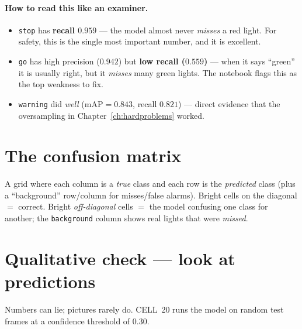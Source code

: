 \paragraph{How to read this like an examiner.}
\begin{itemize}
  \item \texttt{stop} has \textbf{recall $0.959$} --- the model almost
        never \emph{misses} a red light. For safety, this is the single
        most important number, and it is excellent.
  \item \texttt{go} has high precision ($0.942$) but \textbf{low recall
        ($0.559$)} --- when it says ``green'' it is usually right, but it
        \emph{misses} many green lights. The notebook flags this as the
        top weakness to fix.
  \item \texttt{warning} did \emph{well} ($\text{mAP}=0.843$,
        recall $0.821$) --- direct evidence that the oversampling in
        Chapter~\ref{ch:hardproblems} worked.
\end{itemize}


\section{The confusion matrix}
\begin{keyconcept}
A grid where each column is a \emph{true} class and each row is the
\emph{predicted} class (plus a ``background'' row/column for
misses/false alarms). Bright cells on the diagonal $=$ correct. Bright
\emph{off-diagonal} cells $=$ the model confusing one class for another;
the \texttt{background} column shows real lights that were \emph{missed}.
\end{keyconcept}


\section{Qualitative check --- look at predictions}
Numbers can lie; pictures rarely do. CELL~20 runs the model on random
test frames at a confidence threshold of $0.30$.

